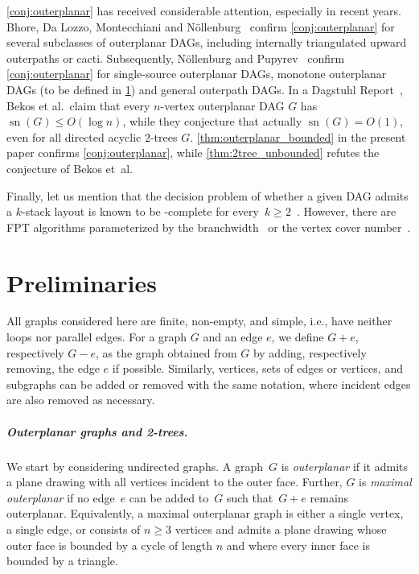 \documentclass{article}
\DeclareMathOperator{\sn}{sn}
\begin{document}
\cref{conj:outerplanar} has received considerable attention, especially in recent years.
Bhore, Da Lozzo, Montecchiani and N\"{o}llenburg~\cite{Bhore2021_UpwardBookThickness} confirm \cref{conj:outerplanar} for several subclasses of outerplanar DAGs, including internally triangulated upward outerpaths or cacti.
Subsequently, N\"{o}llenburg and Pupyrev~\cite{Noellenburg2021_DAGsWithConstantStackNumber} confirm \cref{conj:outerplanar} for single-source outerplanar DAGs, monotone outerplanar DAGs (to be defined in \cref{sec:preliminaries}) and general outerpath DAGs.  
In a Dagstuhl Report~\cite{Bekos2019_Planar_kPlanar}, Bekos et al.\ claim that every $n$-vertex outerplanar DAG $G$ has $\sn(G) \leq O(\log n)$, while they conjecture that actually $\sn(G) = O(1)$, even for all directed acyclic $2$-trees $G$.
\cref{thm:outerplanar_bounded} in the present paper confirms \cref{conj:outerplanar}, while \cref{thm:2tree_unbounded} refutes the conjecture of Bekos et~al.

Finally, let us mention that the decision problem of whether a given DAG admits a $k$-stack layout is known to be \NP-complete for every~$k \geq 2$~\cite{Bekos2022_DAGs2StacksNP,Binucci2019_UpwardStackST,Heath1999_DAGs2}.
However, there are FPT algorithms parameterized by the branchwidth~\cite{Binucci2019_UpwardStackST} or the vertex cover number~\cite{Bhore2021_UpwardBookThickness}.




\section{Preliminaries}
\label{sec:preliminaries}

All graphs considered here are finite, non-empty, and simple, i.e., have neither loops nor parallel edges.
For a graph $ G $ and an edge $ e $, we define $ G + e $, respectively $ G - e $, as the graph obtained from $ G $ by adding, respectively removing, the edge $ e $ if possible.
Similarly, vertices, sets of edges or vertices, and subgraphs can be added or removed with the same notation, where incident edges are also removed as necessary.


\subparagraph{Outerplanar graphs and 2-trees.}
We start by considering undirected graphs.
A graph~$G$ is \emph{outerplanar} if it admits a plane drawing with all vertices incident to the outer face.
Further, $G$ is \emph{maximal outerplanar} if no edge~$e$ can be added to~$G$ such that~$G + e$ remains outerplanar.
Equivalently, a maximal outerplanar graph is either a single vertex, a single edge, or consists of $n \geq 3$ vertices and admits a plane drawing whose outer face is bounded by a cycle of length $n$ and where every inner face is bounded by a triangle.
\end{document}
